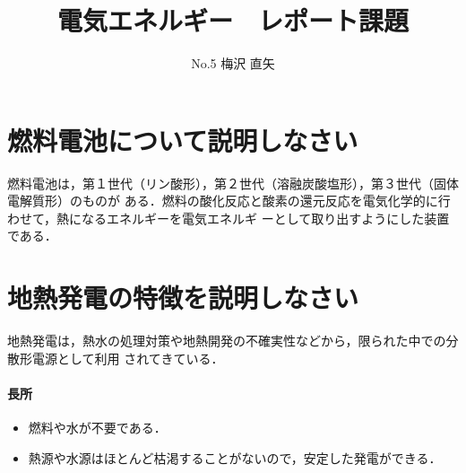 \documentclass[a4paper,11pt]{jsarticle}
\begin{document}
\title{電気エネルギー　レポート課題}
\author{No.5 梅沢 直矢}
\maketitle

\section{燃料電池について説明しなさい}
  燃料電池は，第１世代（リン酸形），第２世代（溶融炭酸塩形），第３世代（固体電解質形）のものが
  ある．燃料の酸化反応と酸素の還元反応を電気化学的に行わせて，熱になるエネルギーを電気エネルギ
  ーとして取り出すようにした装置である．

\section{地熱発電の特徴を説明しなさい}
  地熱発電は，熱水の処理対策や地熱開発の不確実性などから，限られた中での分散形電源として利用
  されてきている．
  \paragraph{長所}
    \begin{itemize}
      \item 燃料や水が不要である．
      \item 熱源や水源はほとんど枯渇することがないので，安定した発電ができる．
    \end{itemize}
    
\end{document}
